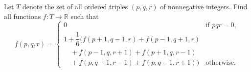 Let $T$ denote the set of all ordered triples $(p, q, r)$ of nonnegative integers. Find all functions $f : T \to \mathbb{R}$ such that
\[ f(p, q, r) = \begin{cases} 0 & \text{if } pqr = 0, \\ 1 + \dfrac{1}{6}\big( f(p+1, q-1, r) + f(p-1, q+1, r) \\ \quad + f(p-1, q, r+1) + f(p+1, q, r-1) \\ \quad + f(p, q+1, r-1) + f(p, q-1, r+1) \big) & \text{otherwise.} \end{cases} \]
